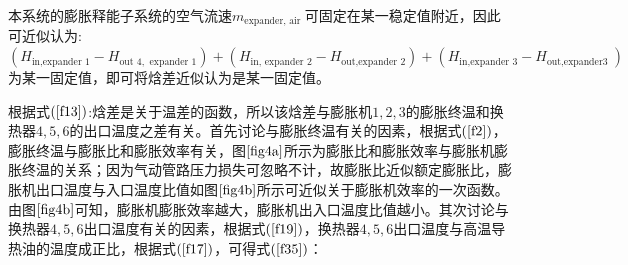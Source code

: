 \documentclass{jnuthesis}
\begin{document}
	\par 本系统的膨胀释能子系统的空气流速$ m_{\text {expander, air }} $可固定在某一稳定值附近，因此可近似认为:\\
	$ \left(H_{\text {in,expander } 1}-H_{\text {out } 4, \text { expander } 1}\right)+\left(H_{\text {in, expander } 2}-H_{\text {out,expander } 2}\right)+\left(H_{\text {in,expander } 3}-H_{\text {out,expander3 }}\right) $为某一固定值，即可将焓差近似认为是某一固定值。
	\par 根据式$ (\fontsize{10.5bp}{10pt}\ref{f13}) $:焓差是关于温差的函数，所以该焓差与膨胀机$ 1,2,3 $的膨胀终温和换热器$ 4,5,6 $的出口温度之差有关。首先讨论与膨胀终温有关的因素，根据式$ (\fontsize{10.5bp}{10pt}\ref{f2}) $，膨胀终温与膨胀比和膨胀效率有关，图$ \fontsize{10.5bp}{10pt}\ref{fig4a} $所示为膨胀比和膨胀效率与膨胀机膨胀终温的关系；因为气动管路压力损失可忽略不计，故膨胀比近似额定膨胀比，膨胀机出口温度与入口温度比值如图$ \fontsize{10.5bp}{10pt}\ref{fig4b} $所示可近似关于膨胀机效率的一次函数。由图$ \fontsize{10.5bp}{10pt}\ref{fig4b} $可知，膨胀机膨胀效率越大，膨胀机出入口温度比值越小。其次讨论与换热器$ 4,5,6 $出口温度有关的因素，根据式$ (\fontsize{10.5bp}{10pt}\ref{f19}) $，换热器$ 4,5,6 $出口温度与高温导热油的温度成正比，根据式$ (\fontsize{10.5bp}{10pt}\ref{f17}) $，可得式$ (\fontsize{10.5bp}{10pt}\ref{f35}) $：
	
\end{document}
